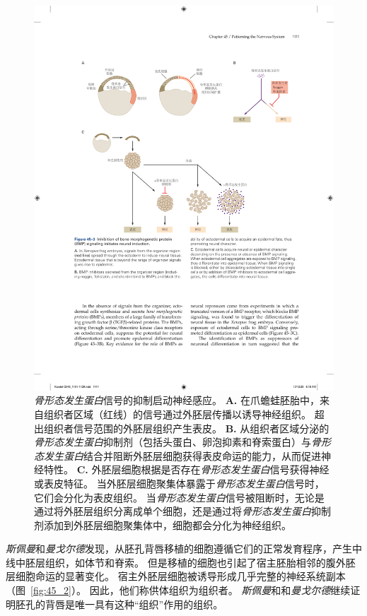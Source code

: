 \begin{figure}[htbp]
	\centering
	\includegraphics[width=1.0\linewidth]{chap45/fig_45_3}
	\caption{\textit{骨形态发生蛋白}信号的抑制启动神经感应。
		\textbf{A.} 在爪蟾蛙胚胎中，来自组织者区域（红线）的信号通过外胚层传播以诱导神经组织。
		超出组织者信号范围的外胚层组织产生表皮。
		\textbf{B.} 从组织者区域分泌的\textit{骨形态发生蛋白}抑制剂（包括头蛋白、卵泡抑素和脊索蛋白）与\textit{骨形态发生蛋白}结合并阻断外胚层细胞获得表皮命运的能力，从而促进神经特性。
		\textbf{C.} 外胚层细胞根据是否存在\textit{骨形态发生蛋白}信号获得神经或表皮特征。
		当外胚层细胞聚集体暴露于\textit{骨形态发生蛋白}信号时，它们会分化为表皮组织。
		当\textit{骨形态发生蛋白}信号被阻断时，无论是通过将外胚层组织分离成单个细胞，还是通过将\textit{骨形态发生蛋白}抑制剂添加到外胚层细胞聚集体中，细胞都会分化为神经组织。}
	\label{fig:45_3}
\end{figure}


\textit{斯佩曼}和\textit{曼戈尔德}发现，从胚孔背唇移植的细胞遵循它们的正常发育程序，产生中线中胚层组织，如体节和脊索。
但是移植的细胞也引起了宿主胚胎相邻的腹外胚层细胞命运的显著变化。
宿主外胚层细胞被诱导形成几乎完整的神经系统副本（图~\ref{fig:45_2}）。
因此，他们称供体组织为组织者。
\textit{斯佩曼}和和\textit{曼戈尔德}继续证明胚孔的背唇是唯一具有这种“组织”作用的组织。


